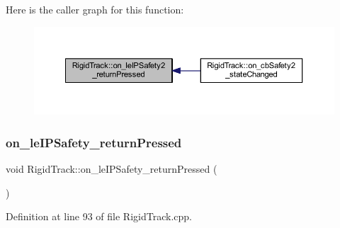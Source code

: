 Here is the caller graph for this function\+:
\nopagebreak
\begin{figure}[H]
\begin{center}
\leavevmode
\includegraphics[width=350pt]{class_rigid_track_a555c536593d659b940de43cd2db8d6c1_icgraph}
\end{center}
\end{figure}
\mbox{\label{class_rigid_track_aa527ab3a2ddc7b31bf1063260efc9755}} 
\subsubsection{\texorpdfstring{on\+\_\+le\+I\+P\+Safety\+\_\+return\+Pressed}{on\_leIPSafety\_returnPressed}}
{\footnotesize\ttfamily void Rigid\+Track\+::on\+\_\+le\+I\+P\+Safety\+\_\+return\+Pressed (\begin{DoxyParamCaption}{ }\end{DoxyParamCaption})\hspace{0.3cm}{\ttfamily [slot]}}



Definition at line 93 of file Rigid\+Track.\+cpp.


